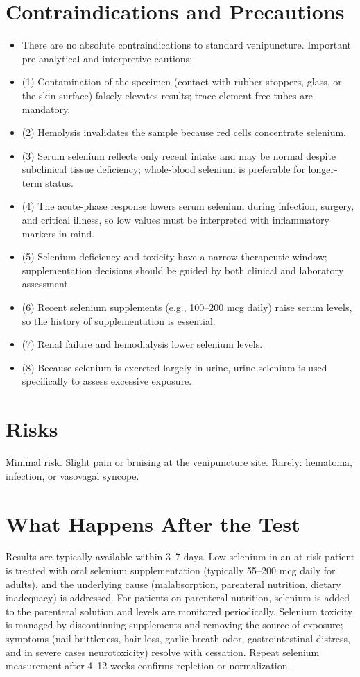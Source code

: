\section*{Contraindications and Precautions}
\begin{itemize}
  \item There are no absolute contraindications to standard venipuncture. Important pre-analytical and interpretive cautions:
  \item (1) Contamination of the specimen (contact with rubber stoppers, glass, or the skin surface) falsely elevates results; trace-element-free tubes are mandatory.
  \item (2) Hemolysis invalidates the sample because red cells concentrate selenium.
  \item (3) Serum selenium reflects only recent intake and may be normal despite subclinical tissue deficiency; whole-blood selenium is preferable for longer-term status.
  \item (4) The acute-phase response lowers serum selenium during infection, surgery, and critical illness, so low values must be interpreted with inflammatory markers in mind.
  \item (5) Selenium deficiency and toxicity have a narrow therapeutic window; supplementation decisions should be guided by both clinical and laboratory assessment.
  \item (6) Recent selenium supplements (e.g., 100--200 mcg daily) raise serum levels, so the history of supplementation is essential.
  \item (7) Renal failure and hemodialysis lower selenium levels.
  \item (8) Because selenium is excreted largely in urine, urine selenium is used specifically to assess excessive exposure.
\end{itemize}
\section*{Risks}
Minimal risk. Slight pain or bruising at the venipuncture site. Rarely: hematoma, infection, or vasovagal syncope.

\section*{What Happens After the Test}
Results are typically available within 3--7 days. Low selenium in an at-risk patient is treated with oral selenium supplementation (typically 55--200 mcg daily for adults), and the underlying cause (malabsorption, parenteral nutrition, dietary inadequacy) is addressed. For patients on parenteral nutrition, selenium is added to the parenteral solution and levels are monitored periodically. Selenium toxicity is managed by discontinuing supplements and removing the source of exposure; symptoms (nail brittleness, hair loss, garlic breath odor, gastrointestinal distress, and in severe cases neurotoxicity) resolve with cessation. Repeat selenium measurement after 4--12 weeks confirms repletion or normalization.

